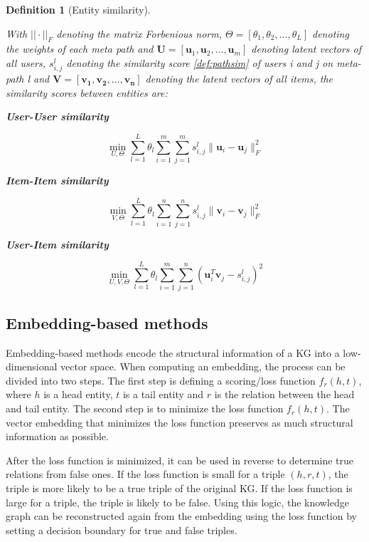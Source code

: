 \documentclass[english, 12pt, a4paper, sci, utf8, a-2b, online]{aaltothesis}
\newtheorem{definition}{Definition}[section]
\begin{document}
\begin{definition}[Entity similarity] 
\label{def:entity_similarity}

With $||\cdot||_F$ denoting the matrix Forbenious norm, $\Theta = [\theta_1, \theta_2, \ldots,  \theta_L]$ denoting the weights of each meta path and $\mathbf{U} = [\mathbf{u}_1, \mathbf{u}_2, \ldots, \mathbf{u}_m]$ denoting latent vectors of all users, $s^l_{i,j}$ denoting the similarity score \eqref{def:pathsim} of users i and j on meta-path l and $\mathbf{V} = [\mathbf{v_1}, \mathbf{v_2}, \ldots, \mathbf{v_n}]$ denoting the latent vectors of all items, the similarity scores between entities are:

\textbf{User-User similarity}

\[
    \min_{U,\Theta} \sum_{l=1}^{L} \theta_l \sum_{i=1}^{m} \sum_{j=1}^{m} s_{i,j}^l \|\mathbf{u}_i - \mathbf{u}_j\|_F^2
\]

\textbf{Item-Item similarity}

\[
    \min_{V,\Theta} \sum_{l=1}^{L} \theta_l \sum_{i=1}^{n} \sum_{j=1}^{n} s_{i,j}^l \|\mathbf{v}_i - \mathbf{v}_j\|_F^2
\]

\textbf{User-Item similarity}

\[
    \min_{U,V,\Theta} \sum_{l=1}^{L} \theta_l \sum_{i=1}^{m} \sum_{j=1}^{n} (\mathbf{u}_i^T \mathbf{v}_j - s_{i,j}^l)^2
\]
\end{definition}


\subsection{Embedding-based methods}
\label{subsec:embedding_based_methods}

Embedding-based methods encode the structural information of a KG into a low-dimensional vector space. When computing an embedding, the process can be divided into two steps. The first step is defining a scoring/loss function $f_r(h,t)$, where $h$ is a head entity, $t$ is a tail entity and $r$ is the relation between the head and tail entity. The second step is to minimize the loss function $f_r(h,t)$. The vector embedding that minimizes the loss function preserves as much structural information as possible. 

After the loss function is minimized, it can be used in reverse to determine true relations from false ones. If the loss function is small for a triple $(h,r,t)$, the triple is more likely to be a true triple of the original KG. If the loss function is large for a triple, the triple is likely to be false. Using this logic, the knowledge graph can be reconstructed again from the embedding using the loss function by setting a decision boundary for true and false triples.
\end{document}

